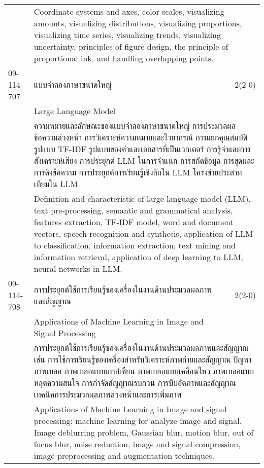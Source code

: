 \begin{longtable}{p{}p{}r{}}
&  \multicolumn{2}{p{0.75\textwidth}}{Coordinate systems and axes, color scales, visualizing amounts, visualizing distributions, visualizing proportions, visualizing time series, visualizing trends, visualizing uncertainty, principles of figure design, the principle of proportional ink, and handling overlapping points.} \vspace{8mm} \\*
09-114-707 & แบบจำลองภาษาขนาดใหญ่ & 2(2-0)\\*
 & Large Language Model & \phantom{x} \vspace{3mm} \\*
&  \multicolumn{2}{p{0.75\textwidth}}{ความหมายและลักษณะของแบบจำลองภาษาขนาดใหญ่ การประมวลผลข้อความล่วงหน้า การวิเคราะห์ความหมายและไวยากรณ์ การแยกคุณสมบัติ รูปแบบ TF-IDF รูปแบบของคำและเอกสารที่เป็นเวกเตอร์ การรู้จําและการสังเคราะห์เสียง การประยุกต์ LLM ในการจำแนก การสกัดข้อมูล การขุดและการดึงข้อความ การประยุกต์การเรียนรู้เชิงลึกใน LLM โครงข่ายประสาทเทียมใน LLM} \vspace{3mm} \\*
&  \multicolumn{2}{p{0.75\textwidth}}{Definition and characteristic of large language model (LLM), text pre-processing, semantic and grammatical analysis, features extraction, TF-IDF model, word and document vectors, speech recognition and synthesis, application of LLM to classification, information extraction, text mining and information retrieval, application of deep learning to LLM, neural networks in LLM.} \vspace{8mm} \\*
09-114-708 & การประยุกต์ใช้การเรียนรู้ของเครื่องในงานด้านประมวลผลภาพและสัญญาณ & 2(2-0)\\*
 & Applications of Machine Learning in Image and Signal Processing & \phantom{x} \vspace{3mm} \\*
&  \multicolumn{2}{p{0.75\textwidth}}{การประยุกต์ใช้การเรียนรู้ของเครื่องในงานด้านประมวลผลภาพและสัญญาณ เช่น การใช้การเรียนรู้ของเครื่องสำหรับวิเคราะห์ภาพถ่ายและสัญญาณ ปัญหาภาพเบลอ ภาพเบลอแบบเกาส์เซียน ภาพเบลอแบบเคลื่อนไหว ภาพเบลอแบบหลุดความสนใจ การกำจัดสัญญาณรบกวน การบีบอัดภาพและสัญญาณ เทคนิคการประมวลผลภาพล่วงหน้าและการเพิ่มภาพ } \vspace{3mm} \\*
&  \multicolumn{2}{p{0.75\textwidth}}{Applications of Machine Learning in Image and signal processing: machine learning for analyze image and signal. Image deblurring problem, Gaussian blur, motion blur, out of focus blur, noise reduction, image and signal compression, image preprocessing and augmentation techniques.} \vspace{8mm} \\*

\end{longtable}
